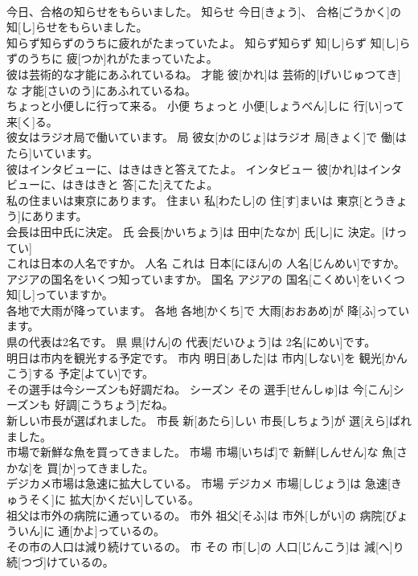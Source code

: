 \documentclass[8pt]{extreport}
\begin{document}
\begin{CJK}{UTF8}{min}
\\	今日、合格の知らせをもらいました。	知らせ	今日[きょう]、 合格[ごうかく]の 知[し]らせをもらいました。	
\\	知らず知らずのうちに疲れがたまっていたよ。	知らず知らず	知[し]らず 知[し]らずのうちに 疲[つか]れがたまっていたよ。	
\\	彼は芸術的な才能にあふれているね。	才能	彼[かれ]は 芸術的[げいじゅつてき]な 才能[さいのう]にあふれているね。	
\\	ちょっと小便しに行って来る。	小便	ちょっと 小便[しょうべん]しに 行[い]って 来[く]る。	
\\	彼女はラジオ局で働いています。	局	彼女[かのじょ]はラジオ 局[きょく]で 働[はたら]いています。	
\\	彼はインタビューに、はきはきと答えてたよ。	インタビュー	彼[かれ]はインタビューに、はきはきと 答[こた]えてたよ。	
\\	私の住まいは東京にあります。	住まい	私[わたし]の 住[す]まいは 東京[とうきょう]にあります。	
\\	会長は田中氏に決定。	氏	会長[かいちょう]は 田中[たなか] 氏[し]に 決定。[けってい]	
\\	これは日本の人名ですか。	人名	これは 日本[にほん]の 人名[じんめい]ですか。	
\\	アジアの国名をいくつ知っていますか。	国名	アジアの 国名[こくめい]をいくつ 知[し]っていますか。	
\\	各地で大雨が降っています。	各地	各地[かくち]で 大雨[おおあめ]が 降[ふ]っています。	
\\	県の代表は2名です。	県	県[けん]の 代表[だいひょう]は 2名[にめい]です。	
\\	明日は市内を観光する予定です。	市内	明日[あした]は 市内[しない]を 観光[かんこう]する 予定[よてい]です。	
\\	その選手は今シーズンも好調だね。	シーズン	その 選手[せんしゅ]は 今[こん]シーズンも 好調[こうちょう]だね。	
\\	新しい市長が選ばれました。	市長	新[あたら]しい 市長[しちょう]が 選[えら]ばれました。	
\\	市場で新鮮な魚を買ってきました。	市場	市場[いちば]で 新鮮[しんせん]な 魚[さかな]を 買[か]ってきました。	
\\	デジカメ市場は急速に拡大している。	市場	デジカメ 市場[しじょう]は 急速[きゅうそく]に 拡大[かくだい]している。	
\\	祖父は市外の病院に通っているの。	市外	祖父[そふ]は 市外[しがい]の 病院[びょういん]に 通[かよ]っているの。	
\\	その市の人口は減り続けているの。	市	その 市[し]の 人口[じんこう]は 減[へ]り 続[つづ]けているの。	

\end{CJK}
\end{document}
